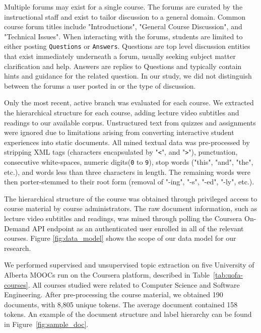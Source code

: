 \documentclass[sigconf, anonymous]{acmart}
\begin{document}
Multiple forums may exist for a single course.
The forums are curated by the instructional staff and exist to tailor discussion to a general domain.
Common course forum titles include "Introductions", "General Course Discussion", and "Technical Issues".
When interacting with the forums, students are limited to either posting \texttt{Questions} or \texttt{Answers}.
Questions are top level discussion entities that exist immediately underneath a forum, usually seeking subject matter clarification and help.
Answers are replies to Questions and typically contain hints and guidance for the related question.
In our study, we did not distinguish between the forums a user posted in or the type of discussion.

Only the most recent, active branch was evaluated for each course.
We extracted the hierarchical structure for each course, adding lecture video subtitles and readings to our available corpus.
Unstructured text from quizzes and assignments were ignored due to limitations arising from converting interactive student experiences into static documents.
All mined textual data was pre-processed by stripping XML tags (characters encapsulated by "\texttt{<}", and "\texttt{>}"), punctuation, consecutive white-spaces, numeric digits(\texttt{0} to \texttt{9}), stop words ("this", "and", "the", etc.), and words less than three characters in length.
The remaining words were then porter-stemmed to their root form (removal of "-ing", "-s", "-ed", "-ly", etc.).

The hierarchical structure of the course was obtained through privileged access to course material by course administrators.
The raw document information, such as lecture video subtitles and readings, was mined through polling the Coursera On-Demand API endpoint as an authenticated user enrolled in all of the relevant courses.
Figure \ref{fig:data_model} shows the scope of our data model for our research.

We performed supervised and unsupervised topic extraction on five University of Alberta MOOCs run on the Coursera platform, described in Table~\ref{tab:uofa-courses}.
All courses studied were related to Computer Science and Software Engineering.
After pre-processing the course material, we obtained 190 documents, with 8,805 unique tokens.
The average document contained 158 tokens.
An example of the document structure and label hierarchy can be found in Figure~\ref{fig:sample_doc}.
\end{document}
